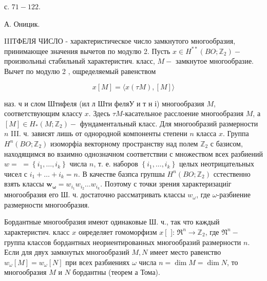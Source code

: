 \documentclass[10pt]{article}
\begin{document}
с. $71-122$.

А. Оницик.



IIIТФЕЛЯ ЧИСЛО - характеристическое число замкнутого многообразия, принимающее значения вычетов по модулю 2. Пусть $x \in H^{* *}\left(B O ; \mathbb{Z}_{2}\right)-$ произвольныі стабильный характеристич. класс, $M-$ замкнутое многообразие. Вычет по модулю 2 , ощределяемый равенством



\[

x[M]=\langle x(\tau M),[M]\rangle

\]



наз. ч и слом Штифеля (ил л Шти феляУ и т н і) многообразия $M$, соответствующим классу $x$. Здесь $\tau M$-касательное расслоение многообразия $M$, а $[M] \in H_{*}\left(M ; \mathbb{Z}_{2}\right)-$ фундаментальный класс. Для многообразий размерности $n$ III. ч. зависят лишь от однородной компоненты степени $n$ класса $x$. Группа $H^{n}\left(B O ; \mathbb{Z}_{2}\right)$ изоморфіа векторному пространству над полем $\mathbb{Z}_{2}$ с базисом, находящимся во взаимно однозначном соответствии с множеством всех разбиений $w=$ $=\left\{i_{1}, \ldots, i_{k}\right\}$ числа $n$, т. е. наборов $\left\{i_{1}, \ldots, i_{k}\right\}$ целых неотрицательных чисел с $i_{1}+\ldots+i_{k}=n$. В качестве базпса групшы $H^{n}\left(B O ; \mathbb{Z}_{2}\right)$ сстественно взять классы $\boldsymbol{w}_{\boldsymbol{\omega}}=w_{i_{1}} w_{i_{2}} \ldots w_{i_{k}}$. Поэтому с точки зрения характеризациіг многообразия его Ш. ч. достаточно рассматривать классы $w_{\omega}$, где $\omega$-разбиение размерности многообразия.



Бордантные многообразия имеют одинаковые Ш. ч., так что каждый характеристич. класс $x$ оиределяет гомоморфизм $x\left[\right.$ ]: $\mathfrak{\Re}^{n} \longrightarrow \mathbb{Z}_{2}$, где $\mathfrak{N}^{n}-$ группа классов бордантных неориентированных многообразий размерности $n$. Если для двух замкнутых многообразий $M, N$ имеет место равенство $w_{\omega}[M]=w_{\omega}[N]$ при всех разбиениях $\omega$ числа $n=\operatorname{dim} M=\operatorname{dim} N$, то многообразия $M$ и $N$ бордантны (теорем а Тома).
\end{document}

